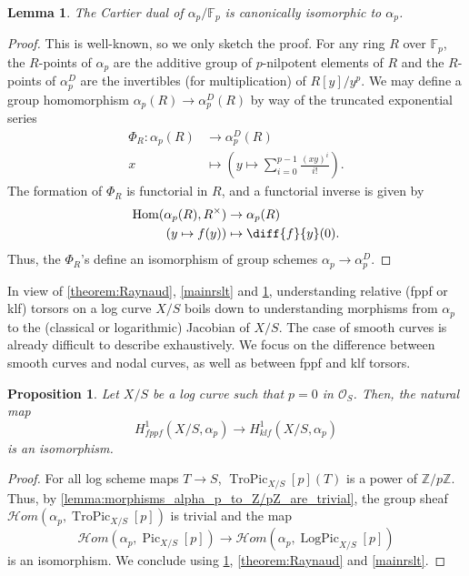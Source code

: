 \documentclass[a4paper,11pt]{amsart} %
\numberwithin{equation}{subsection}
\newcommand{\on}[1]{\operatorname{#1}}
\newcommand{\bb}[1]{{\mathbb{#1}}}
\newcommand{\ca}[1]{{\mathcal{#1}}}
\def\sheafhom{\mathcal{H}om}
\theoremstyle{definition}
\theoremstyle{plain}%
\newtheorem{proposition}[definition]{Proposition}
\newtheorem{lemma}[definition]{Lemma}
\theoremstyle{remark}
\begin{document}
\begin{lemma}\label{lemma:hom_ap_Gm_=_ap}
    The Cartier dual of $\alpha_p/\bb F_p$ is canonically isomorphic to $\alpha_p$.
\end{lemma}

\begin{proof}
    This is well-known, so we only sketch the proof. For any ring $R$ over $\bb F_p$, the $R$-points of $\alpha_p$ are the additive group of $p$-nilpotent elements of $R$ and the $R$-points of $\alpha_p^D$ are the invertibles (for multiplication) of $R[y]/y^p$. We may define a group homomorphism $\alpha_p(R) \to \alpha_p^D(R)$ by way of the truncated exponential series
    \begin{align*}
        \Phi_R \colon \alpha_p(R) & \to \alpha_p^D(R)\\
        x & \mapsto \left(y \mapsto \sum\limits_{i=0}^{p-1} \frac{(xy)^i}{i!} \right).
    \end{align*}
    The formation of $\Phi_R$ is functorial in $R$, and a functorial inverse is given by 
    \begin{align*}
        \on{Hom}(\alpha_p(R),R^\times) & \to \alpha_p(R) \\
        (y \mapsto f(y)) & \mapsto \diff{f}{y}(0).
    \end{align*}
    Thus, the $\Phi_R$'s define an isomorphism of group schemes $\alpha_p \to \alpha_p^D$.
\end{proof}

In view of \ref{theorem:Raynaud}, \ref{mainrslt} and \ref{lemma:hom_ap_Gm_=_ap}, understanding relative (fppf or klf) torsors on a log curve $X/S$ boils down to understanding morphisms from $\alpha_p$ to the (classical or logarithmic) Jacobian of $X/S$. The case of smooth curves is already difficult to describe exhaustively. We focus on the difference between smooth curves and nodal curves, as well as between fppf and klf torsors.

\begin{proposition}\label{alpha_p}
    Let $X/S$ be a log curve such that $p=0$ in $\ca O_S$. Then, the natural map
    \[
    H^1_{fppf}(X/S,\alpha_p) \to H^1_{klf}(X/S,\alpha_p)
    \]
    is an isomorphism.
\end{proposition}

\begin{proof}
    For all log scheme maps $T \to S$, $\on{TroPic}_{X/S}[p](T)$ is a power of $\bb Z/p\bb Z$. Thus, by \ref{lemma:morphisms_alpha_p_to_Z/pZ_are_trivial}, the group sheaf $\sheafhom(\alpha_p,\on{TroPic}_{X/S}[p])$ is trivial and the map
    \[
    \sheafhom(\alpha_p,\on{Pic}_{X/S}[p]) \to \sheafhom(\alpha_p,\on{LogPic}_{X/S}[p])
    \]
    is an isomorphism. We conclude using \ref{lemma:hom_ap_Gm_=_ap}, \ref{theorem:Raynaud} and \ref{mainrslt}.
\end{proof}
\end{document}
